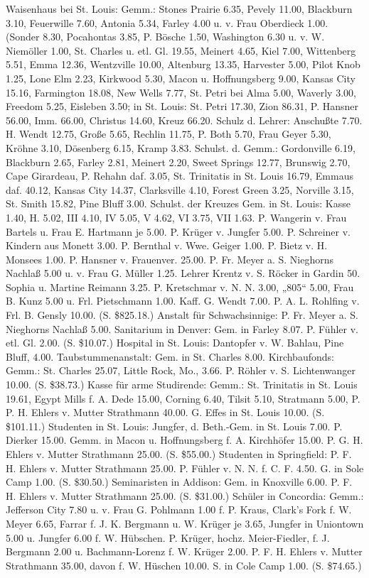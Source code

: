 Waisenhaus bei St. Louis: Gemm.: Stones Prairie 6.35, Pevely 11.00, Blackburn 3.10, Feuerwille 7.60, Antonia 5.34, Farley 4.00 u. v. Frau Oberdieck 1.00. (Sonder 8.30, Pocahontas 3.85, P. Bösche 1.50, Washington 6.30 u. v. W. Niemöller 1.00, St. Charles u. etl. Gl. 19.55, Meinert 4.65, Kiel 7.00, Wittenberg 5.51, Emma 12.36, Wentzville 10.00, Altenburg 13.35, Harvester 5.00, Pilot Knob 1.25, Lone Elm 2.23, Kirkwood 5.30, Macon u. Hoffnungsberg 9.00, Kansas City 15.16, Farmington 18.08, New Wells 7.77, St. Petri bei Alma 5.00, Waverly 3.00, Freedom 5.25, Eisleben 3.50; in St. Louis: St. Petri 17.30, Zion 86.31, P. Hansner 56.00, Imm. 66.00, Christus 14.60, Kreuz 66.20. Schulz d. Lehrer: Anschußte 7.70. H. Wendt 12.75, Große 5.65, Rechlin 11.75, P. Both 5.70, Frau Geyer 5.30, Kröhne 3.10, Dösenberg 6.15, Kramp 3.83. Schulst. d. Gemm.: Gordonville 6.19, Blackburn 2.65, Farley 2.81, Meinert 2.20, Sweet Springs 12.77, Brunswig 2.70, Cape Girardeau, P. Rehahn daf. 3.05, St. Trinitatis in St. Louis 16.79, Emmaus daf. 40.12, Kansas City 14.37, Clarksville 4.10, Forest Green 3.25, Norville 3.15, St. Smith 15.82, Pine Bluff 3.00. Schulst. der Kreuzes Gem. in St. Louis: Kasse 1.40, H. 5.02, III 4.10, IV 5.05, V 4.62, VI 3.75, VII 1.63. P. Wangerin v. Frau Bartels u. Frau E. Hartmann je 5.00. P. Krüger v. Jungfer 5.00. P. Schreiner v. Kindern aus Monett 3.00. P. Bernthal v. Wwe. Geiger 1.00. P. Bietz v. H. Monsees 1.00. P. Hansner v. Frauenver. 25.00. P. Fr. Meyer a. S. Nieghorns Nachlaß 5.00 u. v. Frau G. Müller 1.25. Lehrer Krentz v. S. Röcker in Gardin 50. Sophia u. Martine Reimann 3.25. P. Kretschmar v. N. N. 3.00, „805“ 5.00, Frau B. Kunz 5.00 u. Frl. Pietschmann 1.00. Kaff. G. Wendt 7.00. P. A. L. Rohlfing v. Frl. B. Gensly 10.00. (S. \$825.18.)
Anstalt für Schwachsinnige: P. Fr. Meyer a. S. Nieghorns Nachlaß 5.00.
Sanitarium in Denver: Gem. in Farley 8.07. P. Fühler v. etl. Gl. 2.00. (S. \$10.07.)
Hospital in St. Louis: Dantopfer v. W. Bahlau, Pine Bluff, 4.00.
Taubstummenanstalt: Gem. in St. Charles 8.00.
Kirchbaufonds: Gemm.: St. Charles 25.07, Little Rock, Mo., 3.66. P. Röhler v. S. Lichtenwanger 10.00. (S. \$38.73.)
Kasse für arme Studirende: Gemm.: St. Trinitatis in St. Louis 19.61, Egypt Mills f. A. Dede 15.00, Corning 6.40, Tilsit 5.10, Stratmann 5.00, P. P. H. Ehlers v. Mutter Strathmann 40.00. G. Effes in St. Louis 10.00. (S. \$101.11.)
Studenten in St. Louis: Jungfer, d. Beth.-Gem. in St. Louis 7.00. P. Dierker 15.00. Gemm. in Macon u. Hoffnungsberg f. A. Kirchhöfer 15.00. P. G. H. Ehlers v. Mutter Strathmann 25.00. (S. \$55.00.)
Studenten in Springfield: P. F. H. Ehlers v. Mutter Strathmann 25.00. P. Fühler v. N. N. f. C. F. 4.50. G. in Sole Camp 1.00. (S. \$30.50.)
Seminaristen in Addison: Gem. in Knoxville 6.00. P. F. H. Ehlers v. Mutter Strathmann 25.00. (S. \$31.00.)
Schüler in Concordia: Gemm.: Jefferson City 7.80 u. v. Frau G. Pohlmann 1.00 f. P. Kraus, Clark’s Fork f. W. Meyer 6.65, Farrar f. J. K. Bergmann u. W. Krüger je 3.65, Jungfer in Uniontown 5.00 u. Jungfer 6.00 f. W. Hübschen. P. Krüger, hochz. Meier-Fiedler, f. J. Bergmann 2.00 u. Bachmann-Lorenz f. W. Krüger 2.00. P. F. H. Ehlers v. Mutter
Strathmann 35.00, davon f. W. Hüschen 10.00. S. in Cole Camp 1.00. (S. \$74.65.)

